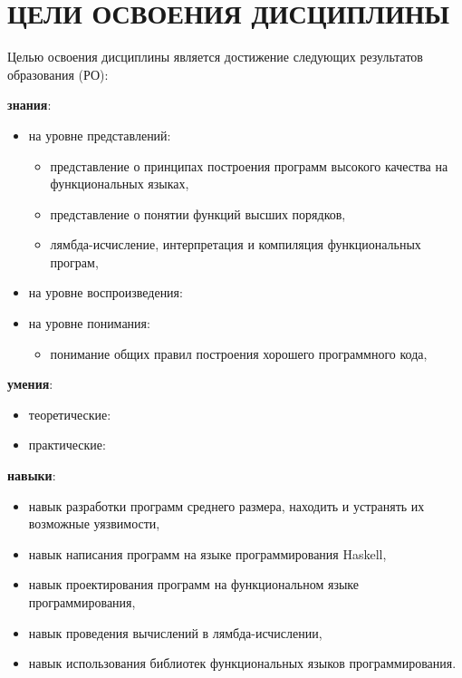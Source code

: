 \newpage
\section{ЦЕЛИ ОСВОЕНИЯ ДИСЦИПЛИНЫ}
Целью освоения дисциплины является достижение следующих результатов образования (РО):\\

{\parindent0pt
\textbf{знания}:
\begin{itemize}
\item на уровне представлений:
\begin{itemize}
\item представление о принципах построения программ высокого качества на функциональных языках,\item представление о понятии функций высших порядков,\item лямбда-исчисление, интерпретация и компиляция функциональных програм,
\end{itemize}
\item на уровне воспроизведения:

\item на уровне понимания:
\begin{itemize}
\item понимание общих правил построения хорошего программного кода,
\end{itemize}
\end{itemize}
\textbf{умения}:\\
\begin{itemize}
\item теоретические:

\item практические:

\end{itemize}
\textbf{навыки}:
\begin{itemize}
\item навык разработки программ среднего размера, находить и устранять их возможные уязвимости,\item навык написания программ на языке программирования Haskell,\item навык проектирования программ на функциональном языке программирования,\item навык проведения вычислений в лямбда-исчислении,\item навык использования библиотек функциональных языков программирования.
\end{itemize}

}
